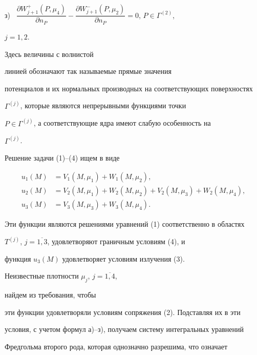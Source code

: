 з) \ $\dfrac{\partial W_{j+1}^{+}(P, \mu_4)}{\partial n_P}-


\dfrac{\partial W_{j+1}^{-}(P, \mu_2)}{\partial n_P}=0$, $P\in\Gamma^{(2)}$,


$j=1,2$.








\noindent{}Здесь величины с волнистой 


линией обозначают так называемые прямые значения 


потенциалов и их нормальных производных на соответствующих поверхностях 


$\Gamma^{(j)}$, которые являются непрерывными функциями точки 


$P\in\Gamma^{(j)}$, а соответствующие ядра имеют слабую особенность на 


$\Gamma^{(j)}$.





Решение задачи (1)--(4) ищем в виде


\begin{align*}


u_1(M)&= V_1(M, \mu_1)+ W_1(M, \mu_2),\\


u_2(M)&= V_2(M, \mu_1)+ W_2(M, \mu_2)+


V_2(M, \mu_3)+ W_2(M, \mu_4),\\


u_3(M)&= V_3(M, \mu_3)+ W_3(M, \mu_4).


\end{align*}


Эти функции являются решениями уравнений (1) соответственно в областях 


$T^{(j)}$, $j=\overline{1,3}$, удовлетворяют граничным условиям (4), и 


функция $u_3(M)$ удовлетворяет условиям излучения (3).





Неизвестные плотности $\mu_j$, $j=\overline{1,4}$,


найдем из требования, чтобы 


эти функции удовлетворяли условиям сопряжения (2). Подставляя их в эти 


условия, с учетом формул а)--з), получаем систему интегральных уравнений 


Фредгольма второго рода, которая однозначно разрешима, что означает 


